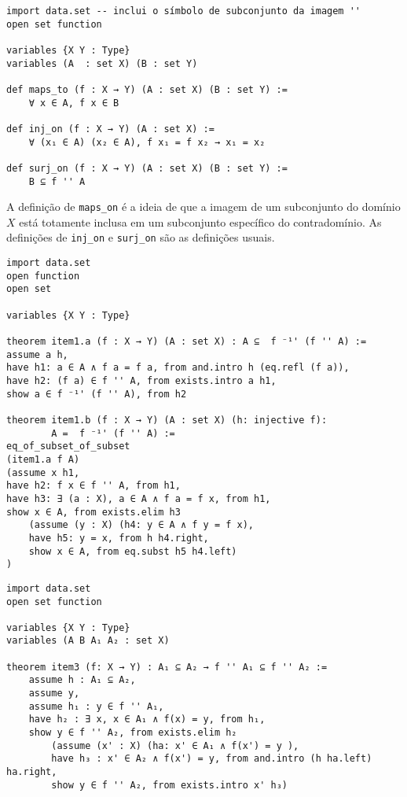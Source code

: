 \begin{lstlisting}
import data.set -- inclui o símbolo de subconjunto da imagem ''
open set function

variables {X Y : Type}
variables (A  : set X) (B : set Y)

def maps_to (f : X → Y) (A : set X) (B : set Y) :=
    ∀ x ∈ A, f x ∈ B

def inj_on (f : X → Y) (A : set X) :=
    ∀ (x₁ ∈ A) (x₂ ∈ A), f x₁ = f x₂ → x₁ = x₂

def surj_on (f : X → Y) (A : set X) (B : set Y) :=
    B ⊆ f '' A

\end{lstlisting}

A definição de \lstinline{maps_on} é a ideia de que a imagem de um subconjunto
do domínio $X$ está totamente inclusa em um subconjunto específico do
contradomínio. As definições de \lstinline{inj_on} e \lstinline{surj_on} são
as definições usuais.

\begin{theorem}[Item 1]
\end{theorem}

\begin{lstlisting}
import data.set 
open function
open set 

variables {X Y : Type}

theorem item1.a (f : X → Y) (A : set X) : A ⊆  f ⁻¹' (f '' A) := 
assume a h, 
have h1: a ∈ A ∧ f a = f a, from and.intro h (eq.refl (f a)),
have h2: (f a) ∈ f '' A, from exists.intro a h1,   
show a ∈ f ⁻¹' (f '' A), from h2

theorem item1.b (f : X → Y) (A : set X) (h: injective f): 
        A =  f ⁻¹' (f '' A) :=
eq_of_subset_of_subset
(item1.a f A)
(assume x h1, 
have h2: f x ∈ f '' A, from h1,
have h3: ∃ (a : X), a ∈ A ∧ f a = f x, from h1,
show x ∈ A, from exists.elim h3
    (assume (y : X) (h4: y ∈ A ∧ f y = f x),
    have h5: y = x, from h h4.right,
    show x ∈ A, from eq.subst h5 h4.left)
)
\end{lstlisting}

\begin{theorem}[Item 3]
\end{theorem}

\begin{lstlisting}
import data.set
open set function

variables {X Y : Type}
variables (A B A₁ A₂ : set X)

theorem item3 (f: X → Y) : A₁ ⊆ A₂ → f '' A₁ ⊆ f '' A₂ :=
    assume h : A₁ ⊆ A₂,
    assume y,
    assume h₁ : y ∈ f '' A₁,
    have h₂ : ∃ x, x ∈ A₁ ∧ f(x) = y, from h₁,
    show y ∈ f '' A₂, from exists.elim h₂
        (assume (x' : X) (ha: x' ∈ A₁ ∧ f(x') = y ),
        have h₃ : x' ∈ A₂ ∧ f(x') = y, from and.intro (h ha.left)  ha.right,
        show y ∈ f '' A₂, from exists.intro x' h₃)    
\end{lstlisting}

